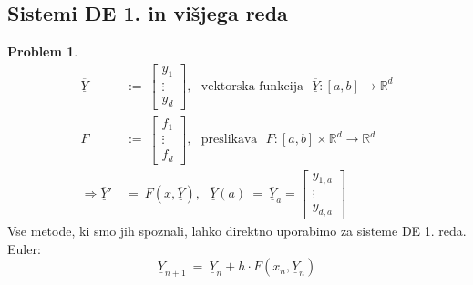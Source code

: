 \documentclass[11pt]{article}
\newcommand{\R}{\mathbb{R}}
\theoremstyle{definition}
\theoremstyle{definition}
\newtheorem{problem}{Problem}[section]
\begin{document}

\subsection{Sistemi DE 1. in višjega reda}
\vspace{0.5cm}

\begin{problem}

\begin{align*}
\overline{\underline{Y}} ~&:=~ \begin{bmatrix}
y_1 \\
\vdots \\
y_d
\end{bmatrix}, ~~~\text{vektorska funkcija}~~~ \overline{\underline{Y}}: [a, b] \rightarrow \R^d \\
F ~&:=~ \begin{bmatrix}
f_1 \\
\vdots \\
f_d
\end{bmatrix}, ~~~\text{preslikava}~~~ F: [a, b] \times \R^d \rightarrow \R^d \\
\Longrightarrow \overline{\underline{Y}}' ~&=~ F(x, \overline{\underline{Y}}), ~~~\overline{\underline{Y}}(a) ~=~ \overline{\underline{Y}}_a = \begin{bmatrix}
y_{1, a} \\
\vdots \\
y_{d, a}
\end{bmatrix}
\end{align*}
Vse metode, ki smo jih spoznali, lahko direktno uporabimo za sisteme DE 1. reda. \\

Euler:
$$\overline{\underline{Y}}_{n+1} ~=~ \overline{\underline{Y}}_n + h \cdot F(x_n, \overline{\underline{Y}}_n)$$

\end{problem}
\vspace{0.5cm}
\end{document}
